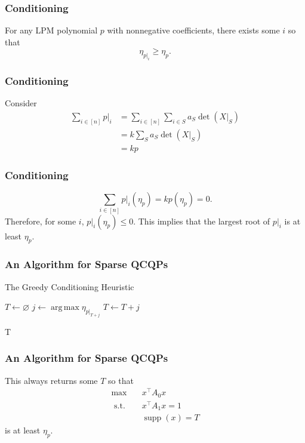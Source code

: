 \documentclass{beamer}
\DeclareMathOperator*{\argmax}{arg\,max}
\DeclareMathOperator*{\supp}{supp}
\newcommand{\st}{{\text{ s.t. }}}
\begin{document}
\begin{frame}
    \frametitle{Conditioning}
    \begin{theorem}
    For any LPM polynomial $p$ with nonnegative coefficients, there exists some $i$ so that
    \[
        \eta_{p|_i} \ge \eta_{p}.
    \]
    \end{theorem}
\end{frame}
\begin{frame}
    \frametitle{Conditioning}
    Consider
        \begin{align*} 
        \sum_{i \in [n]} p|_{i}&=\sum_{i \in [n]} \sum_{i \in  S} a_S \det(X|_S)\\
                &=k\sum_{S} a_S \det(X|_S)\\
                &=kp
        \end{align*}
\end{frame}
\begin{frame}
    \frametitle{Conditioning}
    \[
        \sum_{i\in [n]}p|_i(\eta_p) = kp(\eta_p) = 0.
    \]
    \pause
    Therefore, for some $i$, $ p|_{i}(\eta_{p}) \le 0$.
    \pause
    This implies that the largest root of $p|_{i}$ is at least $\eta_{p}$.
\end{frame}
\begin{frame}
    \begin{algorithm}[H]
    \frametitle{An Algorithm for Sparse QCQPs}
    \caption{The Greedy Conditioning Heuristic}
    \label{alg:greedy}
    \begin{algorithmic}
        \State $T \gets \varnothing$
            \State $j \gets \argmax \eta_{p|_{T + j}}$
            \State $T \gets T + j$
        \EndFor

        \Return T
    \end{algorithmic}
    \end{algorithm}
\end{frame}
\begin{frame}
    \frametitle{An Algorithm for Sparse QCQPs}
    
This always returns some $T$ so that 
\begin{equation*}
    \begin{aligned}
        \max\quad & x^{\intercal}A_0x\\
        \st & x^{\intercal}A_1x = 1\\
            & \supp(x) = T
    \end{aligned}
\end{equation*}
is at least $\eta_p$.
\end{frame}
\end{document}
